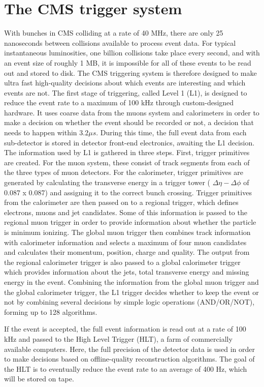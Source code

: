\chapter{The CMS trigger system}
With bunches in CMS colliding at a rate of 40 MHz, there are only 25 nanoseconds between collisions available to process event data. For typical instantaneous luminosities, one billion collisions take place every second, and with an event size of roughly 1 MB, it is impossible for all of these events to be read out and stored to disk. The CMS triggering system is therefore designed to make ultra fast high-quality decisions about which events are interesting and which events are not.
The first stage of triggering, called Level 1 (L1), is designed to reduce the event rate to a maximum of 100 kHz through custom-designed hardware. It uses coarse data from the muons system and calorimeters in order to make a decision on whether the event should be recorded or not, a decision that needs to happen within $3.2 \mu s$. During this time, the full event data from each sub-detector is stored in detector front-end electronics, awaiting the L1 decision. The information used by L1 is gathered in three steps. First, trigger primitives are created. For the muon system, these consist of track segments from each of the three types of muon detectors. For the calorimeter, trigger primitives are generated by calculating the transverse energy in a trigger tower ( $\Delta \eta- \Delta \phi$ of 0.087 x 0.087) and assigning it to the correct bunch crossing. Trigger primitives from the calorimeter are then passed on to a regional trigger, which defines electrons, muons and jet candidates. Some of this information is passed to the regional muon trigger in order to provide information about whether the particle is minimum ionizing. The global muon trigger then combines track information with calorimeter information and selects a maximum of four muon candidates and calculates their momentum, position, charge and quality. The output from the regional calorimeter trigger is also passed to a global calorimeter trigger which provides information about the jets, total transverse energy and missing energy in the event. Combining the information from the global muon trigger and the global calorimeter trigger, the L1 trigger decides whether to keep the event or not by combining several decisions by simple logic operations (AND/OR/NOT), forming up to 128 algorithms.

If the event is accepted, the full event information is read out at a rate of 100 kHz and passed to the High Level Trigger (HLT), a farm of commercially available computers. Here, the full precision of the detector data is used in order to make decisions based on offline-quality reconstruction algorithms. The goal of the HLT is to eventually reduce the event rate to an average of 400 Hz, which will be stored on tape.
